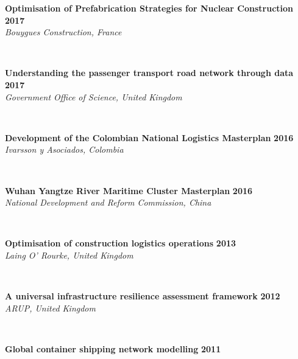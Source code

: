 \documentclass[margin]{res}
\newcommand\tab[1][1cm]{\hspace*{#1}}
\begin{document}
\begin{resume}
	\vspace{0.03in}
	\begin{minipage}{\textwidth}
	{\bf Optimisation of Prefabrication Strategies for Nuclear Construction} \hfill {\bf 2017} \\
	\tab[0.2in] 
	\textit{Bouygues Construction, France}
	\end{minipage}\\
	\vspace{0.03in}
	\begin{minipage}{\textwidth}
	{\bf Understanding the passenger transport road network through data} \hfill {\bf 2017} \\
	\tab[0.2in] 
	\textit{Government Office of Science, United Kingdom}
	\end{minipage}\\
	\vspace{0.03in}
	\begin{minipage}{\textwidth}
	{\bf Development of the Colombian National Logistics Masterplan} \hfill {\bf 2016} \\
	\tab[0.2in] 
	\textit{Ivarsson y Asociados, Colombia}
	\end{minipage}\\
	\vspace{0.03in}
	\begin{minipage}{\textwidth}
	{\bf Wuhan Yangtze River Maritime Cluster Masterplan} \hfill {\bf 2016} \\
	\tab[0.2in] 
	\textit{National Development and Reform Commission, China}
	\end{minipage}\\
	\vspace{0.03in}
	\begin{minipage}{\textwidth}
	{\bf Optimisation of construction logistics operations} \hfill {\bf 2013} \\
	\tab[0.2in] 
	\textit{Laing O' Rourke, United Kingdom}
	\end{minipage}\\
	\vspace{0.03in}
	\begin{minipage}{\textwidth}
	{\bf A universal infrastructure resilience assessment framework} \hfill {\bf 2012} \\
	\tab[0.2in] 
	\textit{ARUP, United Kingdom}
	\end{minipage}\\
	\vspace{0.03in}
	\begin{minipage}{\textwidth}
	{\bf Global container shipping network modelling} \hfill {\bf 2011} \\

\end{minipage}
\end{resume}
\end{document}
